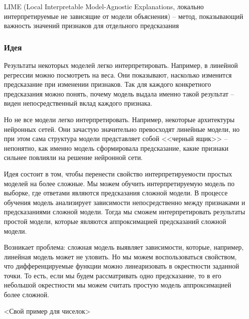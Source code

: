 LIME (Local Interpretable Model-Agnostic Explanations, локально интерпретируемые не зависящие от модели объяснения) -- метод, показывающий важность значений признаков для отдельного предсказания

\subsubsection{Идея}
Результаты некоторых моделей легко интерпретировать. Например, в линейной регрессии можно посмотреть на веса. Они показывают, насколько изменится предсказание при изменении признаков. Так для каждого конкретного предсказания можно понять, почему модель выдала именно такой результат -- виден непосредственный вклад каждого признака.

Но не все модели легко интерпретировать. Например, некоторые архитектуры нейронных сетей. Они зачастую значительно превосходят линейные модели, но при этом сама структура модели представляет собой <<черный ящик>> -- непонятно, как именно модель сформировала предсказание, какие признаки сильнее повлияли на решение нейронной сети.

Идея состоит в том, чтобы перенести свойство интерпретируемости простых моделей на более сложные. Мы можем обучить интерпретируемую модель по выборке, где ответами являются предсказания сложной модели. В процессе обучения модель анализирует зависимости непосредственно между признаками и предсказаниями сложной модели. Тогда мы сможем интерпретировать результаты простой модели, которые являются аппроксимацией предсказаний сложной модели.

Возникает проблема: сложная модель выявляет зависимости, которые, например, линейная модель может не уловить. Но мы можем воспользоваться свойством, что дифференцируемые функции можно линеаризовать в окрестности заданной точки. То есть, если мы будем рассматривать одно предсказание, то в его небольшой окрестности мы можем считать простую модель аппроксимацией более сложной.


<Свой пример для чиселок>